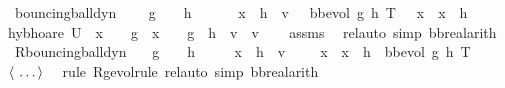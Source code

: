 \documentclass[envcountsame,envcountsect]{llncs}
\begin{document}
\begin{example}
\begin{isabellebody}
\isanewline
{}\isamarkupfalse%
\ bouncing{\isacharunderscore}ball{\isacharunderscore}dyn{\isacharcolon}\ \isanewline
\ \ \ {\isachardoublequoteopen}g\ {\isacharless}\ {}{\isachardoublequoteclose}\ \ {\isachardoublequoteopen}h\ {\isasymge}\ {}{\isachardoublequoteclose}\isanewline
\ \ \ {\isachardoublequoteopen}\ \isactrlbold {\isacharbraceleft}x\ {\isacharequal}\ h\ {\isasymand}\ v\ {\isacharequal}\ {}\isactrlbold {\isacharbraceright}\ bb{\isacharunderscore}evol\ g\ h\ T\ \ {\isasymle}\ x\ {\isasymand}\ x\ {\isasymle}\ h\isactrlbold {\isacharbraceright}{\isachardoublequoteclose}\isanewline
{}\isamarkupfalse%
{\isacharparenleft}hyb{\isacharunderscore}hoare\ {\isachardoublequoteopen}U{\isacharparenleft}{}\ {\isasymle}\ x\ {\isasymand}\ {}\ {\isasymcdot}\ g\ {\isasymcdot}\ x\ {\isacharequal}\ {}\ {\isasymcdot}\ g\ {\isasymcdot}\ h\ {\isacharplus}\ v\ {\isasymcdot}\ v{\isacharparenright}{\isachardoublequoteclose}{\isacharparenright}\isanewline
\ \ \isamarkupfalse%
\ assms\ \isamarkupfalse%
\ {\isacharparenleft}rel{\isacharunderscore}auto{\isacharprime}\ simp{\isacharcolon}\ bb{\isacharunderscore}real{\isacharunderscore}arith{\isacharparenright}\isanewline
\isanewline
{}\isamarkupfalse\ R{\isacharunderscore}bouncing{\isacharunderscore}ball{\isacharunderscore}dyn{\isacharcolon}\isanewline
\ \ \ {\isachardoublequoteopen}g\ {\isacharless}\ {}{\isachardoublequoteclose}\ \ {\isachardoublequoteopen}h\ {\isasymge}\ {}{\isachardoublequoteclose}\isanewline
\ \ \ {\isachardoublequoteopen}\isactrlbold {\isacharbrackleft}x\ {\isacharequal}\ h\ {\isasymand}\ v\ {\isacharequal}\ {}{\isacharcomma}\ {}\ {\isasymle}\ x\ {\isasymand}\ x\ {\isasymle}\ h\isactrlbold {\isacharbrackright}\ {\isasymge}\ bb{\isacharunderscore}evol\ g\ h\ T{\isachardoublequoteclose}\isanewline
\ \ $\langle \isa{\dots}\rangle$\ \isamarkupfalse%
\ {\isacharparenleft}rule\ R{\isacharunderscore}g{\isacharunderscore}evol{\isacharunderscore}rule{\isacharcomma}\ rel{\isacharunderscore}auto{\isacharprime}\ simp{\isacharcolon}\ bb{\isacharunderscore}real{\isacharunderscore}arith{\isacharparenright}\isanewline
\end{isabellebody}


\end{example}
\end{document}
